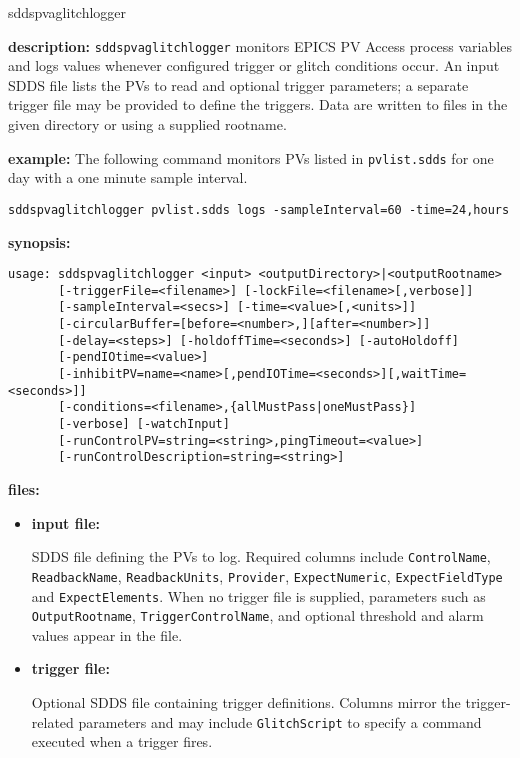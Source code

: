 \begin{sddsprog}{sddspvaglitchlogger}
\item \textbf{description:}
\verb+sddspvaglitchlogger+ monitors EPICS PV Access process variables and
logs values whenever configured trigger or glitch conditions occur.  An input
SDDS file lists the PVs to read and optional trigger parameters; a separate
trigger file may be provided to define the triggers.  Data are written to
files in the given directory or using a supplied rootname.

\item \textbf{example:}
The following command monitors PVs listed in \verb+pvlist.sdds+ for one day
with a one minute sample interval.
\begin{verbatim}
sddspvaglitchlogger pvlist.sdds logs -sampleInterval=60 -time=24,hours
\end{verbatim}

\item \textbf{synopsis:}
\begin{verbatim}
usage: sddspvaglitchlogger <input> <outputDirectory>|<outputRootname>
       [-triggerFile=<filename>] [-lockFile=<filename>[,verbose]]
       [-sampleInterval=<secs>] [-time=<value>[,<units>]]
       [-circularBuffer=[before=<number>,][after=<number>]]
       [-delay=<steps>] [-holdoffTime=<seconds>] [-autoHoldoff]
       [-pendIOtime=<value>]
       [-inhibitPV=name=<name>[,pendIOTime=<seconds>][,waitTime=<seconds>]]
       [-conditions=<filename>,{allMustPass|oneMustPass}]
       [-verbose] [-watchInput]
       [-runControlPV=string=<string>,pingTimeout=<value>]
       [-runControlDescription=string=<string>]
\end{verbatim}

\item \textbf{files:}
  \begin{itemize}
  \item \textbf{input file:}\par
    SDDS file defining the PVs to log. Required columns include
    {\tt ControlName}, {\tt ReadbackName}, {\tt ReadbackUnits},
    {\tt Provider}, {\tt ExpectNumeric}, {\tt ExpectFieldType} and
    {\tt ExpectElements}. When no trigger file is supplied, parameters such as
    {\tt OutputRootname}, {\tt TriggerControlName}, and optional threshold and
    alarm values appear in the file.
  \item \textbf{trigger file:}\par
    Optional SDDS file containing trigger definitions. Columns mirror the
    trigger-related parameters and may include {\tt GlitchScript} to specify a
    command executed when a trigger fires.
  \end{itemize}


\end{sddsprog}
